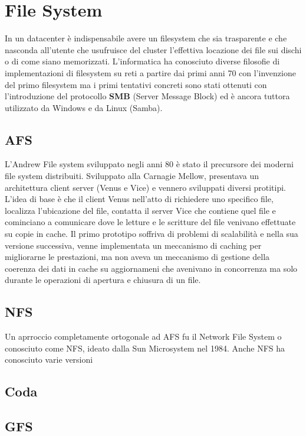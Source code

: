 \section{File System} 
In un datacenter è indispensabile avere un filesystem che sia trasparente e che nasconda all'utente che usufruisce del cluster l'effettiva locazione dei file sui dischi o di come siano memorizzati. L'informatica ha conosciuto diverse filosofie di implementazioni di filesystem su reti a partire dai primi anni 70 con l'invenzione del primo filesystem ma i primi tentativi concreti sono stati ottenuti con l'introduzione del protocollo \textbf{SMB} (Server Message Block) ed è ancora tuttora utilizzato da Windows e da Linux (Samba).
\subsection{AFS}
L'Andrew File system sviluppato negli anni 80 è stato il precursore dei moderni file system distribuiti. Sviluppato alla Carnagie Mellow, presentava un architettura client server (Venus e Vice) e vennero sviluppati diversi protitipi. L'idea di base è che il client Venus nell'atto di richiedere uno specifico file, localizza l'ubicazione del file, contatta il server Vice che contiene quel file e cominciano a comunicare dove le letture e le scritture del file venivano effettuate su copie in cache. Il primo prototipo soffriva di problemi di scalabilità e nella sua versione successiva, venne implementata un meccanismo di caching per migliorarne le prestazioni, ma non aveva un meccanismo di gestione della coerenza dei dati in cache su aggiornameni che avenivano in concorrenza ma solo durante le operazioni di apertura e chiusura di un file.
\subsection{NFS}
Un aprroccio completamente ortogonale ad AFS fu il Network File System o conosciuto come NFS, ideato dalla Sun Microsystem nel 1984. Anche NFS ha conosciuto varie versioni
\subsection{Coda}
\subsection{GFS}
